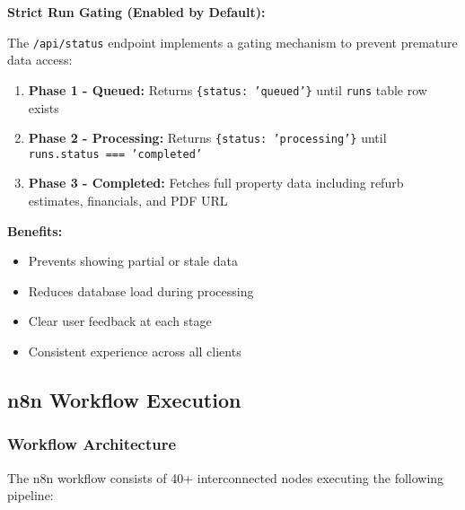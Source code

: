 \documentclass[11pt,a4paper]{article}
\begin{document}
\textbf{Strict Run Gating (Enabled by Default):}

The \texttt{/api/status} endpoint implements a gating mechanism to prevent premature data access:

\begin{enumerate}
  \item \textbf{Phase 1 - Queued:} Returns \texttt{\{status: 'queued'\}} until \texttt{runs} table row exists
  \item \textbf{Phase 2 - Processing:} Returns \texttt{\{status: 'processing'\}} until \texttt{runs.status === 'completed'}
  \item \textbf{Phase 3 - Completed:} Fetches full property data including refurb estimates, financials, and PDF URL
\end{enumerate}

\textbf{Benefits:}
\begin{itemize}
  \item Prevents showing partial or stale data
  \item Reduces database load during processing
  \item Clear user feedback at each stage
  \item Consistent experience across all clients
\end{itemize}

\subsection{n8n Workflow Execution}

\subsubsection{Workflow Architecture}

The n8n workflow consists of 40+ interconnected nodes executing the following pipeline:
\end{document}
